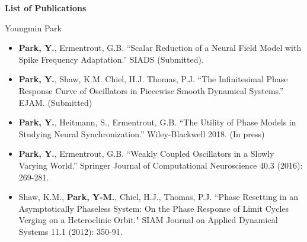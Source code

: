 \documentclass[a4paper,11pt]{article}
\begin{document}
\begin{center}
\Large \textbf{List of Publications}

\Large Youngmin Park
\end{center}

\begin{itemize}

 \item \textbf{Park, Y.}, Ermentrout, G.B. ``Scalar Reduction of a Neural Field Model with Spike Frequency Adaptation.'' SIADS (Submitted).
 \item \textbf{Park, Y.}, Shaw, K.M. Chiel, H.J. Thomas, P.J. ``The Infinitesimal Phase Response Curve of Oscillators in Piecewise Smooth Dynamical Systems.'' EJAM. (Submitted)
 \item \textbf{Park, Y.}, Heitmann, S., Ermentrout, G.B. ``The Utility of Phase Models in Studying Neural Synchronization.'' Wiley-Blackwell 2018. (In press)
 \item \textbf{Park, Y.}, Ermentrout, G.B. ``Weakly Coupled Oscillators in a Slowly Varying World.'' Springer Journal of Computational Neuroscience 40.3 (2016): 269-281.
 \item Shaw, K.M., \textbf{Park, Y-M.}, Chiel, H.J., Thomas, P.J. ``Phase Resetting in an Asymptotically Phaseless System: On the Phase Response of Limit Cycles Verging on a Heteroclinic Orbit." SIAM Journal on Applied Dynamical Systems 11.1 (2012): 350-91.
\end{itemize}
\end{document}
